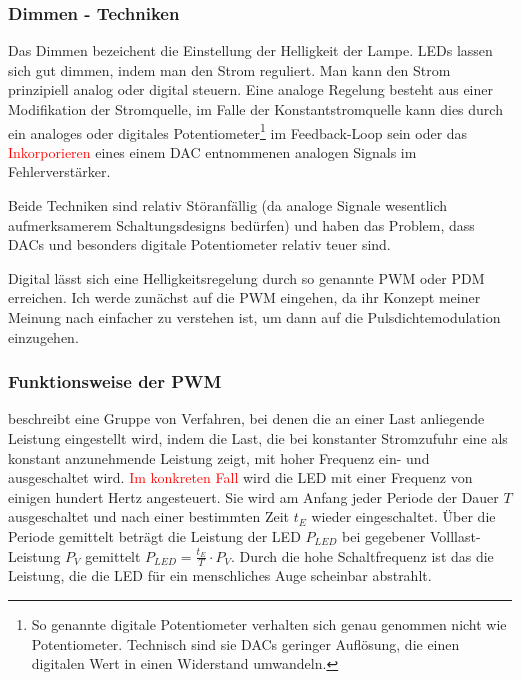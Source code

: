 \documentclass[12pt,a4paper,notitlepage]{article}
\newcommand{\annot}[1]{\textcolor{red}{#1}}
\begin{document}
\subsubsection{Dimmen - Techniken}
Das Dimmen bezeichent die Einstellung der Helligkeit der Lampe. \glspl{LED} lassen sich gut dimmen, indem man den Strom reguliert. Man kann den Strom prinzipiell analog oder digital steuern. Eine analoge Regelung besteht aus einer Modifikation der Stromquelle, im Falle der Konstantstromquelle kann dies durch ein analoges oder digitales Potentiometer\footnote{So genannte digitale Potentiometer verhalten sich genau genommen nicht wie Potentiometer. Technisch sind sie \glspl{DAC} geringer Auflösung, die einen digitalen Wert in einen Widerstand umwandeln.} im Feedback-Loop sein oder das \annot{Inkorporieren} eines einem \gls{DAC} entnommenen analogen Signals im Fehlerverstärker\cite{MAXIM23,MAXIM41,MAXIM42,ANALOG4,ANALOG5}.

Beide Techniken sind relativ Störanfällig (da analoge Signale wesentlich aufmerksamerem Schaltungsdesigns bedürfen) und haben das Problem, dass \glspl{DAC} und besonders digitale Potentiometer relativ teuer sind.

Digital lässt sich eine Helligkeitsregelung durch so genannte \gls{PWM} oder \gls{PDM} erreichen. Ich werde zunächst auf die \gls{PWM} eingehen, da ihr Konzept meiner Meinung nach einfacher zu verstehen ist, um dann auf die Pulsdichtemodulation einzugehen.

\subsubsection{Funktionsweise der PWM}
 beschreibt eine Gruppe von Verfahren, bei denen die an einer Last anliegende Leistung eingestellt wird, indem die Last, die bei konstanter Stromzufuhr eine als konstant anzunehmende Leistung zeigt, mit hoher Frequenz ein- und ausgeschaltet wird. \annot{Im konkreten Fall} wird die \gls{LED} mit einer Frequenz von einigen hundert \gls{Hertz} angesteuert. Sie wird am Anfang jeder Periode der Dauer $T$ ausgeschaltet und nach einer bestimmten Zeit $t_E$ wieder eingeschaltet. Über die Periode gemittelt beträgt die Leistung der \gls{LED} $P_{LED}$ bei gegebener Volllast-Leistung $P_V$ gemittelt $P_{LED}=\frac{t_E}{T}\cdot P_{V}$. Durch die hohe Schaltfrequenz ist das die Leistung, die die \gls{LED} für ein menschliches Auge scheinbar abstrahlt.
\end{document}
